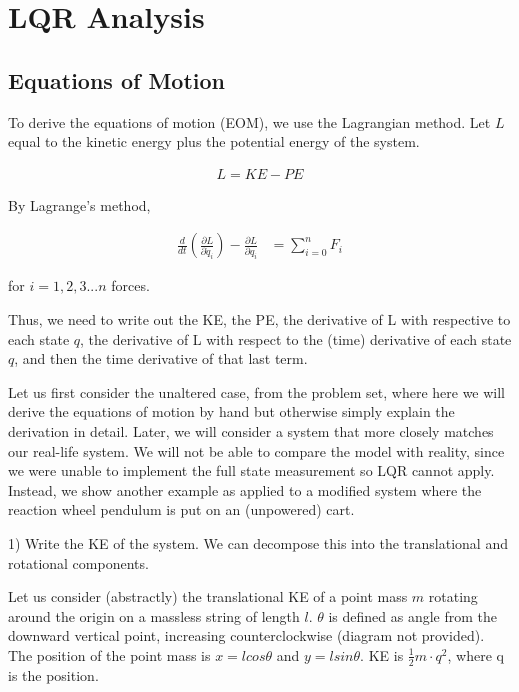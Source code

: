\documentclass[conference]{IEEEtran}
\begin{document}
\section{LQR Analysis}

\subsection{Equations of Motion}

To derive the equations of motion (EOM), we use the Lagrangian method. Let $L$
equal to the kinetic energy plus the potential energy of the system.


\begin{align}
    L = KE - PE
\end{align}

By Lagrange's method,

\begin{align}
    \frac{d}{dt} (\frac{\partial{L}}{\partial \dot{q}_i}) -
    \frac{\partial{L}}{\partial q_i}  &= \sum_{i=0}^{n} F_i
\end{align}

for $i = 1,2,3 ... n $ forces.

Thus, we need to write out the KE, the PE, the derivative of L with respective
to each state $q$, the derivative of L with respect to the (time) derivative of
each state $q$, and then the time derivative of that last term.

Let us first consider the unaltered case, from the problem set, where here we
will derive the equations of motion by hand but otherwise simply explain the
derivation in detail. Later, we will consider a system that more closely matches
our real-life system. We will not be able to compare the model with reality,
since we were unable to implement the full state measurement so LQR cannot
apply. Instead, we show another example as applied to a modified system where
the reaction wheel pendulum is put on an (unpowered) cart.


1) Write the KE of the system. We can decompose this into the translational and
rotational components.

Let us consider (abstractly) the translational KE of a point mass $m$ rotating
around the origin on a massless string of length $l$. $\theta$ is defined as
angle from the downward vertical point, increasing counterclockwise  (diagram not provided).
The position of the point mass is $x = l cos \theta$ and $y = l sin \theta$.
KE is $\frac{1}{2} m \cdot q^2$, where q is the position.
\end{document}
